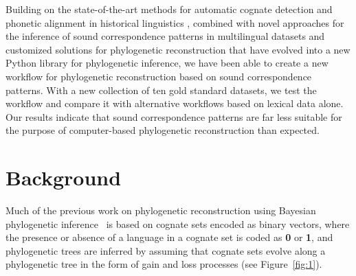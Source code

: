 \documentclass[10pt, a4paper]{article}
\begin{document}
Building on the state-of-the-art methods for automatic cognate detection and phonetic alignment in historical linguistics \citep{List2016g}, combined with novel approaches for the inference of sound correspondence patterns in multilingual datasets \citep{List2019a} and customized solutions for phylogenetic reconstruction \citep{Rama2019} that have evolved into a new Python library for phylogenetic inference, we have been able to create a new workflow for phylogenetic reconstruction based on sound correspondence patterns.  With a new collection of ten gold standard datasets, we test the workflow and compare it with alternative workflows based on lexical data alone. Our results indicate that sound correspondence patterns are far less suitable for the purpose of computer-based phylogenetic reconstruction than expected.






\section{Background}\label{sec:motiv}

Much of the previous work on phylogenetic reconstruction using Bayesian phylogenetic inference~\cite{Kolipakam2018,Sagart2019,rama2018automatic} is based on cognate sets encoded as binary vectors, where the presence or absence of a language in a cognate set is coded as \textbf{0} or \textbf{1}, and phylogenetic trees are inferred by assuming that cognate sets evolve along a phylogenetic tree in the form of gain and loss processes (see Figure~\ref{fig:1}).
\end{document}
